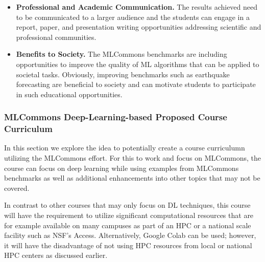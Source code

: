 \begin{itemize}
\item {\bf Professional and Academic Communication.} The results achieved need to be communicated to a larger audience and the students can engage in a report, paper, and presentation writing opportunities addressing scientific and professional communities.

\item {\bf Benefits to Society.} The MLCommons benchmarks are including opportunities to improve the quality of ML algorithms that can be applied to societal tasks. Obviously, improving benchmarks such as earthquake forecasting are beneficial to society and can motivate students to participate in such educational opportunities.

\end{itemize}


\subsubsection{MLCommons Deep-Learning-based Proposed Course Curriculum}

In this section we explore the idea to potentially create a course curriculumn 
utilizing the MLCommons effort. For this to work and focus on MLCommons, the course can focus on deep learning while using examples from MLCommons benchmarks as well as additional enhancements into other topics that may not be covered.

In contrast to other courses that may only focus on DL techniques, this course will have the requirement to utilize significant computational resources that are for example available on many campuses as part of an HPC or a national scale facility such as NSF's Access. Alternatively, Google Colab can be used; however, it will have the disadvantage of not using HPC resources from local or national HPC centers as discussed earlier.


